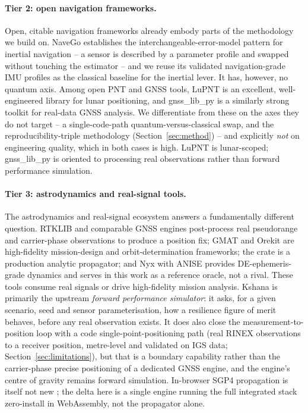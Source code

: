 \paragraph{Tier 2: open navigation frameworks.}
Open, citable navigation frameworks already embody parts of the methodology we build
on. NaveGo \citep{gonzalez2017navego} establishes the interchangeable-error-model
pattern for inertial navigation -- a sensor is described by a parameter profile and
swapped without touching the estimator -- and we reuse its validated navigation-grade
IMU profiles as the classical baseline for the inertial lever. It has, however, no
quantum axis. Among open PNT and GNSS tools, LuPNT \citep{iiyama2023lupnt} is an
excellent, well-engineered library for lunar positioning, and gnss\_lib\_py
\citep{knowles2024gnsslibpy} is a similarly strong toolkit for real-data GNSS
analysis. We differentiate from these on the axes they do not target -- a
single-code-path quantum-versus-classical swap, and the reproducibility-triple
methodology (Section~\ref{sec:method}) -- and explicitly \emph{not} on engineering
quality, which in both cases is high. LuPNT is lunar-scoped; gnss\_lib\_py is oriented
to processing real observations rather than forward performance simulation.

\paragraph{Tier 3: astrodynamics and real-signal tools.}
The astrodynamics and real-signal ecosystem answers a fundamentally different
question. RTKLIB and comparable GNSS engines \citep{takasu2009} post-process real
pseudorange and carrier-phase observations to produce a position fix; GMAT
\citep{nasa_gmat} and Orekit \citep{orekit} are high-fidelity mission-design and
orbit-determination frameworks; the  crate \citep{sgp4crate} is a
production analytic propagator; and Nyx with ANISE \citep{nyxanise} provides
DE-ephemeris-grade dynamics and serves in this work as a reference oracle, not a
rival. These tools consume real signals or drive high-fidelity mission analysis.
Kshana is primarily the upstream \emph{forward performance simulator}: it asks, for a
given scenario, seed and sensor parameterisation, how a resilience figure of merit
behaves, before any real observation exists. It does also close the
measurement-to-position loop with a code single-point-positioning path (real RINEX
observations to a receiver position, metre-level and validated on IGS data;
Section~\ref{sec:limitations}), but that is a boundary capability rather than the
carrier-phase precise positioning of a dedicated GNSS engine, and the engine's centre of
gravity remains forward simulation. In-browser SGP4 propagation is itself not new
\citep{satellitejs}; the delta here is a single engine running the full integrated
stack zero-install in WebAssembly, not the propagator alone.

